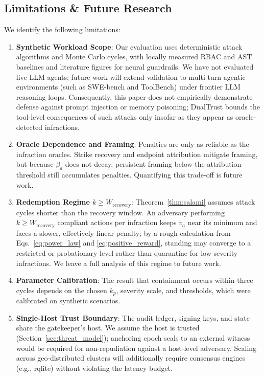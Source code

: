 \documentclass[journal]{IEEEtran}
\begin{document}
\subsection{Limitations \& Future Research}
We identify the following limitations:
\begin{enumerate}[leftmargin=12pt, topsep=2pt, itemsep=1pt]
\item \textbf{Synthetic Workload Scope}: Our evaluation uses deterministic attack algorithms and Monte Carlo cycles, with locally measured RBAC and AST baselines and literature figures for neural guardrails. We have not evaluated live LLM agents; future work will extend validation to multi-turn agentic environments (such as SWE-bench and ToolBench) under frontier LLM reasoning loops. Consequently, this paper does not empirically demonstrate defense against prompt injection or memory poisoning; DualTrust bounds the tool-level consequences of such attacks only insofar as they appear as oracle-detected infractions.
\item \textbf{Oracle Dependence and Framing}: Penalties are only as reliable as the infraction oracles. Strike recovery and endpoint attribution mitigate framing, but because $\beta_a$ does not decay, persistent framing below the attribution threshold still accumulates penalties. Quantifying this trade-off is future work.
\item \textbf{Redemption Regime $k \ge W_{\text{recovery}}$}: Theorem~\ref{thm:salami} assumes attack cycles shorter than the recovery window. An adversary performing $k \ge W_{\text{recovery}}$ compliant actions per infraction keeps $v_a$ near its minimum and faces a slower, effectively linear penalty; by a rough calculation from Eqs.~\eqref{eq:power_law} and \eqref{eq:positive_reward}, standing may converge to a restricted or probationary level rather than quarantine for low-severity infractions. We leave a full analysis of this regime to future work.
\item \textbf{Parameter Calibration}: The result that containment occurs within three cycles depends on the chosen $k_p$, severity scale, and thresholds, which were calibrated on synthetic scenarios.
\item \textbf{Single-Host Trust Boundary}: The audit ledger, signing keys, and state share the gatekeeper's host. We assume the host is trusted (Section~\ref{sec:threat_model}); anchoring epoch seals to an external witness would be required for non-repudiation against a host-level adversary. Scaling across geo-distributed clusters will additionally require consensus engines (e.g., rqlite) without violating the latency budget.

\end{enumerate}
\end{document}
